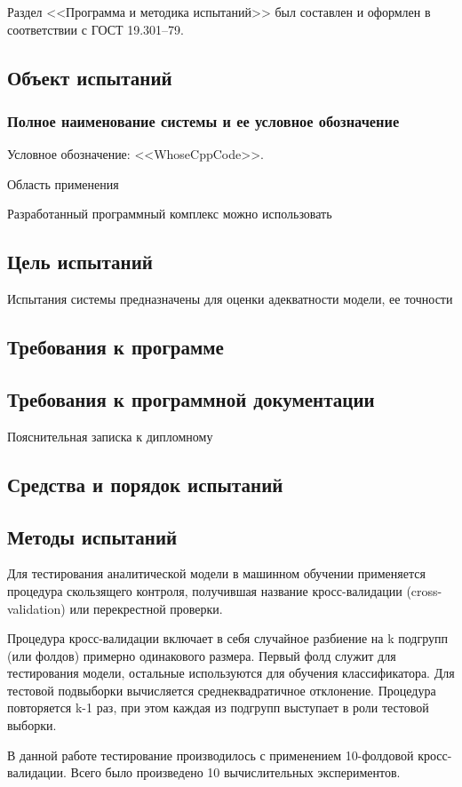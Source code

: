 Раздел <<Программа и методика испытаний>> был составлен и оформлен в соответствии с ГОСТ 19.301--79.~\cite{gost_19301} 

\subsection{Объект испытаний}
\subsubsection{Полное наименование системы и ее условное обозначение}

Условное обозначение: <<WhoseCppCode>>.

Область применения

Разработанный программный комплекс можно использовать


\subsection{Цель испытаний}

Испытания системы предназначены для оценки адекватности модели, ее точности

\subsection{Требования к программе}

\subsection{Требования к программной документации}

Пояснительная записка к дипломному 

\subsection{Средства и порядок испытаний}

\subsection{Методы испытаний}

Для тестирования аналитической модели в машинном обучении применяется процедура скользящего
контроля, получившая название кросс-валидации (cross-validation) или перекрестной проверки.~\cite{crossval}

Процедура кросс-валидации включает в себя случайное разбиение на k подгрупп (или фолдов) примерно
одинакового размера. Первый фолд служит для тестирования модели, остальные используются для обучения
классификатора. Для тестовой подвыборки вычисляется среднеквадратичное отклонение. Процедура повторяется k-1
раз, при этом каждая из подгрупп выступает в роли тестовой выборки.

В данной работе тестирование производилось с применением 10-фолдовой кросс-валидации. Всего было произведено
10 вычислительных экспериментов.

